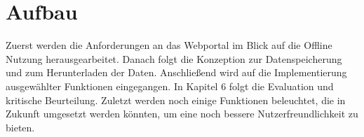 \section{Aufbau}
Zuerst werden die Anforderungen an das Webportal im Blick auf die Offline Nutzung herausgearbeitet. Danach folgt die Konzeption zur Datenspeicherung und zum Herunterladen der Daten. Anschließend wird auf die Implementierung ausgewählter Funktionen eingegangen. In Kapitel 6 folgt die Evaluation und kritische Beurteilung. Zuletzt werden noch einige Funktionen beleuchtet, die in Zukunft umgesetzt werden könnten, um eine noch bessere Nutzerfreundlichkeit zu bieten.
